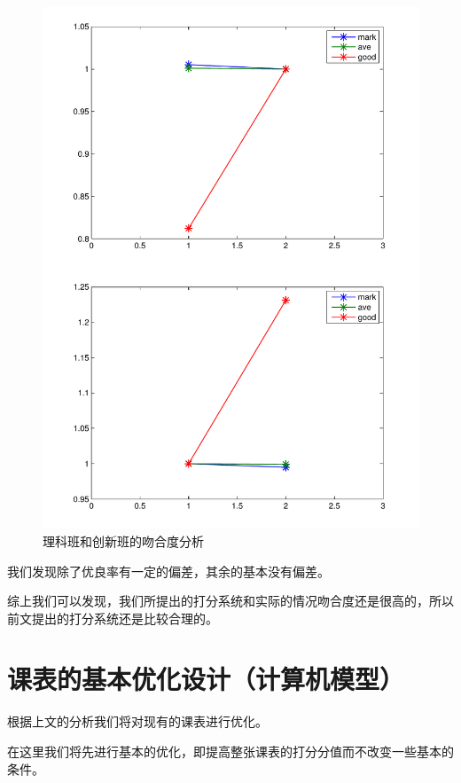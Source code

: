 \documentclass[a4paper]{article}
\begin{document}
  \begin{figure}[H]
  \centerline{\includegraphics[scale=0.4]{coincideinno.pdf}}
  \caption{理科班和创新班的吻合度分析}
  \end{figure}

  我们发现除了优良率有一定的偏差，其余的基本没有偏差。

  综上我们可以发现，我们所提出的打分系统和实际的情况吻合度还是很高的，所以前文提出的打分系统还是比较合理的。

\clearpage

\section{课表的基本优化设计（计算机模型）}

 根据上文的分析我们将对现有的课表进行优化。

 在这里我们将先进行基本的优化，即提高整张课表的打分分值而不改变一些基本的条件。
\end{document}
